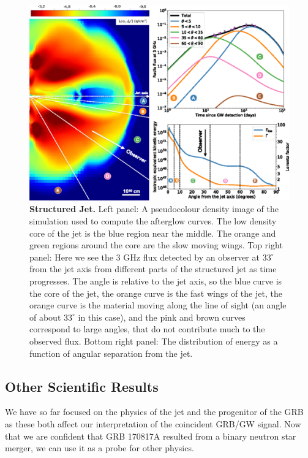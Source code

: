\documentclass[11pt]{cuthesis}
\begin{document}
\begin{figure} %
\begin{center}
\includegraphics[width=1.0\linewidth]{structured_jet.png}
\end{center}
\caption{\textbf{Structured Jet.} Left panel: A pseudocolour density image of the simulation used to compute the afterglow curves. The low density core of the jet is the blue region near the middle. The orange and green regions around the core are the slow moving wings.  Top right panel: Here we see the 3 GHz flux detected by an observer at $33^\circ$ from the jet axis from different parts of the structured jet as time progresses. The angle is relative to the jet axis, so the blue curve is the core of the jet, the orange curve is the fast wings of the jet, the orange curve is the material moving along the line of sight (an angle of about $33^\circ$ in this case), and the pink and brown curves correspond to large angles, that do not contribute much to the observed flux. Bottom right panel: The distribution of energy as a function of angular separation from the jet.\cite{Lazzati_afterglow} }
\label{fig:structured jet}
\end{figure}



\subsection{Other Scientific Results}
We have so far focused on the physics of the jet and the progenitor of the GRB as these both affect our interpretation of the coincident GRB/GW signal. Now that we are confident that GRB 170817A resulted from a binary neutron star merger, we can use it as a probe for other physics. 
\end{document}
